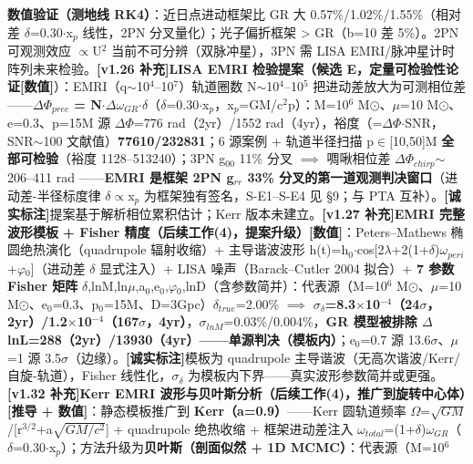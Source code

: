 \documentclass[UTF8,fontset=windows]{csoarticle}
\newcommand{\mtag}[1]{\textbf{[#1]}}
\newcommand{\up}[1]{\ensuremath{^{#1}}}
\newcommand{\down}[1]{\ensuremath{_{#1}}}
\begin{document}
\textbf{数值验证（测地线 RK4）}：近日点进动框架比 GR 大 0.57\%/1.02\%/1.55\%（相对差 \ensuremath{\delta}=0.30\ensuremath{\cdot}x\down{p} 线性，2PN 分叉量化）；光子偏折框架 > GR（b=10 差 5\%）。2PN 可观测效应 \ensuremath{\propto}U\up{2} 当前不可分辨（双脉冲星），3PN 需 LISA EMRI/脉冲星计时阵列未来检验。\textbf{\mtag{v1.26 补充}LISA EMRI 检验提案（候选 E，定量可检验性论证}\mtag{数值}）：EMRI（q\ensuremath{\sim}10\up{4}--10\up{7}）轨道圈数 N\ensuremath{\sim}10\up{4}--10\up{5} 把进动差放大为可测相位差------\textbf{\ensuremath{\Delta}\ensuremath{\Phi}\down{prec} = N\ensuremath{\cdot}\ensuremath{\Delta}\ensuremath{\omega}\down{GR}\ensuremath{\cdot}\ensuremath{\delta}}（\ensuremath{\delta}=0.30\ensuremath{\cdot}x\down{p}，x\down{p}=GM/c\up{2}p）：M=10\up{6} M\ensuremath{\odot}、\ensuremath{\mu}=10 M\ensuremath{\odot}、e=0.3、p=15M 源 \ensuremath{\Delta}\ensuremath{\Phi}=776 rad（2yr）/1552 rad（4yr），裕度（=\ensuremath{\Delta}\ensuremath{\Phi}\ensuremath{\cdot}SNR，SNR\ensuremath{\sim}100 文献值）\textbf{77610/232831}；6 源案例 + 轨道半径扫描 p\ensuremath{\in}[10,50]M \textbf{全部可检验}（裕度 1128--513240）；3PN g\down{00} 11\% 分叉 \ensuremath{\implies} 啁啾相位差 \ensuremath{\Delta}\ensuremath{\Phi}\down{chirp}\ensuremath{\sim}206--411 rad \checkmark------\textbf{EMRI 是框架 2PN g\down{rr} 33\% 分叉的第一道观测判决窗口}（进动差-半径标度律 \ensuremath{\delta}\ensuremath{\propto}x\down{p} 为框架独有签名，S-E1--S-E4 见 \S{}9；与 PTA 互补）。\mtag{诚实标注}提案基于解析相位累积估计；Kerr 版本未建立。\textbf{\mtag{v1.27 补充}EMRI 完整波形模板 + Fisher 精度（后续工作(4)，提案升级）}\mtag{数值}：Peters--Mathews 椭圆绝热演化（quadrupole 辐射收缩）+ 主导谐波波形 h(t)=h\down{0}\ensuremath{\cdot}cos[2\ensuremath{\lambda}+2(1+\ensuremath{\delta})\ensuremath{\omega}\down{peri}+\ensuremath{\varphi}\down{0}]（进动差 \ensuremath{\delta} 显式注入）+ LISA 噪声（Barack--Cutler 2004 拟合）+ \textbf{7 参数 Fisher 矩阵} {\ensuremath{\delta},lnM,ln\ensuremath{\mu},a\down{0},e\down{0},\ensuremath{\varphi}\down{0},lnD}（含参数简并）：代表源（M=10\up{6} M\ensuremath{\odot}、\ensuremath{\mu}=10 M\ensuremath{\odot}、e\down{0}=0.3、p\down{0}=15M、D=3Gpc）\ensuremath{\delta}\down{true}=2.00\% \ensuremath{\implies} \textbf{\ensuremath{\sigma}\down{\delta{}}=8.3\ensuremath{\times}10\up{-4}（24\ensuremath{\sigma}，2yr）/1.2\ensuremath{\times}10\up{-4}（167\ensuremath{\sigma}，4yr）}，\ensuremath{\sigma}\down{lnM}=0.03\%/0.004\%，\textbf{GR 模型被排除 \ensuremath{\Delta}lnL=288（2yr）/13930（4yr）------单源判决（模板内）}；e\down{0}=0.7 源 13.6\ensuremath{\sigma}、\ensuremath{\mu}=1 源 3.5\ensuremath{\sigma}（边缘）。\mtag{诚实标注}模板为 quadrupole 主导谐波（无高次谐波/Kerr/自旋-轨道），Fisher 线性化，\ensuremath{\sigma}\down{\delta{}} 为模板内下界------真实波形参数简并或更强。\textbf{\mtag{v1.32 补充}Kerr EMRI 波形与贝叶斯分析（后续工作(4)，推广到旋转中心体）}\mtag{推导 + 数值}：静态模板推广到 \textbf{Kerr（a=0.9）}------Kerr 圆轨道频率 \ensuremath{\Omega}=\ensuremath{\sqrt{GM}}/[r\up{3/2}+a\ensuremath{\sqrt{GM/c\up{2}}}] + quadrupole 绝热收缩 + 框架进动差注入 \ensuremath{\omega}\down{total}=(1+\ensuremath{\delta})\ensuremath{\omega}\down{GR}（\ensuremath{\delta}=0.30\ensuremath{\cdot}x\down{p}）；方法升级为\textbf{贝叶斯（剖面似然 + 1D MCMC）}：代表源（M=10\up{6} 
\end{document}
